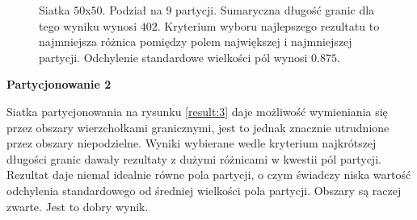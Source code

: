 \begin{figure}[h]
\begin{subfigure}{.33\textwidth}
    \caption[short]{}
\end{subfigure}
\caption{Siatka $50$x$50$. Podział na $9$ partycji. Sumaryczna długość granic dla tego wyniku wynosi $402$.
Kryterium wyboru najlepszego rezultatu to najmniejsza różnica pomiędzy polem największej i najmniejszej partycji.
Odchylenie standardowe wielkości pól wynosi $0.875$.}
\label{result:2}
\end{figure}

\newpage
\vspace{3mm}
\textbf{Partycjonowanie 2}
\vspace{1mm}

Siatka partycjonowania na rysunku \ref{result:3} daje możliwość wymieniania się przez obszary wierzchołkami granicznymi,
jest to jednak znacznie utrudnione przez obszary niepodzielne.
Wyniki wybierane wedle kryterium najkrótszej długości granic dawały rezultaty z dużymi różnicami w kwestii pól partycji.
Rezultat daje niemal idealnie równe pola partycji, o czym świadczy niska wartość odchylenia standardowego od średniej wielkości
pola partycji.
Obszary są raczej zwarte.
Jest to dobry wynik.

